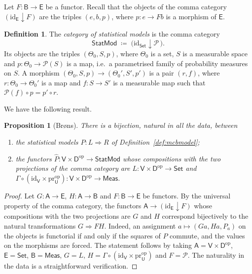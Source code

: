 \documentclass[11pt,a4paper]{article}
\theoremstyle{plain}
\newtheorem{proposition}[theorem]{Proposition}
\theoremstyle{definition}
\newtheorem{definition}[theorem]{Definition}
\theoremstyle{remark}
\newcommand{\cat}[1]{\mathsf{#1}}
\newcommand{\catU}{\cat{U}}
\newcommand{\catV}{\cat{V}}
\newcommand{\catD}{\cat{D}}
\newcommand{\Meas}{\cat{Meas}}
\newcommand{\Set}{\cat{Set}}
\newcommand{\Prb}{\mathcal{P}}
\newcommand{\op}{\mathrm{op}}
\newcommand{\id}{\mathrm{id}}
\newcommand{\pr}{\mathrm{pr}}
\newcommand{\StatMod}{\cat{StatMod}}
\begin{document}
Let $F \colon \cat{B} \to \cat{E}$ be a functor. Recall that the objects of the
comma category $(\id_{\cat E} \downarrow F)$ are the triples $(e, b, p)$, where
$p \colon e \to F b$ is a morphism of $\cat{E}$.

\begin{definition}\label{def:statmod}
The \emph{category of statistical models} is the comma category
\[
\StatMod \;\coloneqq\; \bigl(\id_{\Set} \downarrow \Prb\,\bigr).
\]
Its objects are the triples $(\Theta_0,S,p)$, where $\Theta_0$ is a set, $S$ is
a measurable space and $p \colon \Theta_0 \to \Prb(S)$ is a map, i.e.\ a
parametrised family of probability measures on $S$. A morphism
$(\Theta_0,S,p) \to (\Theta_0',S',p')$ is a pair $(r,f)$, where
$r \colon \Theta_0 \to \Theta_0'$ is a map and $f \colon S \to S'$ is a
measurable map such that $\Prb(f) \circ p = p' \circ r$.
\end{definition}

We have the following result.

\begin{proposition}[Br\o ns]\label{prop:brons}
There is a bijection, natural in all the data, between
\begin{enumerate}
\item the statistical models $P \colon L \Rightarrow R$ of
Definition~\ref{def:mcbmodel};
\item the functors $\widehat{P} \colon \catV \times \catD^{\op} \to \StatMod$
whose compositions with the two projections of the comma category are
$L \colon \catV \times \catD^{\op} \to \Set$ and
$\Gamma \circ (\id_{\catV} \times \pr_\catU^{\op}) \colon
\catV \times \catD^{\op} \to \Meas$.
\end{enumerate}
\end{proposition}

\begin{proof}
Let $G \colon \cat{A} \to \cat{E}$, $H \colon \cat{A} \to \cat{B}$ and
$F \colon \cat{B} \to \cat{E}$ be functors. By the universal property of the
comma category, the functors $\cat{A} \to (\id_{\cat E} \downarrow F)$ whose
compositions with the two projections are $G$ and $H$ correspond bijectively
to the natural transformations $G \Rightarrow F H$. Indeed, an assignment
$a \mapsto (G a, H a, P_a)$ on the objects is functorial if and only if the
squares of $P$ commute, and the values on the morphisms are forced. The
statement follows by taking $\cat{A} = \catV \times \catD^{\op}$,
$\cat{E} = \Set$, $\cat{B} = \Meas$, $G = L$,
$H = \Gamma \circ (\id_{\catV} \times \pr_\catU^{\op})$ and $F = \Prb$. The
naturality in the data is a straightforward verification.
\end{proof}
\end{document}
